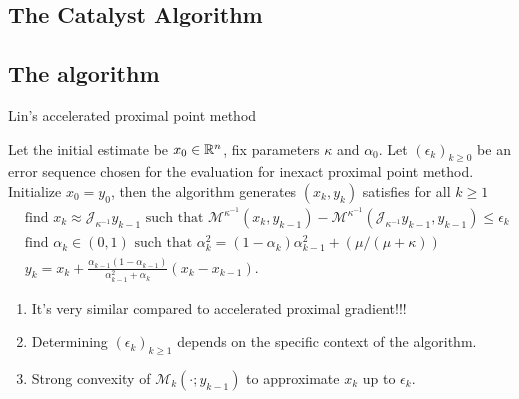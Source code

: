 \documentclass[11pt]{beamer}
\begin{document}
    \subsection{The Catalyst Algorithm}
        \subsection{The algorithm}
            \begin{frame}{Lin's accelerated proximal point method}
                \begin{definition}
                    Let the initial estimate be $x_0 \in \mathbb R^n$, fix parameters $\kappa$ and $\alpha_0$. 
                    Let $(\epsilon_k)_{k \ge 0}$ be an error sequence chosen for the evaluation for inexact proximal point method. 
                    Initialize $x_0 = y_0$, then the algorithm generates $(x_k, y_k)$ satisfies for all $k \ge 1$
                    {\small
                    \begin{align*}
                        & \text{find } x_k \approx \mathcal J_{\kappa^{-1}} y_{k - 1} \text{ such that } \mathcal M^{\kappa^{-1}}(x_k, y_{k - 1}) - \mathcal M^{\kappa^{-1}}(\mathcal J_{\kappa^{-1}}y_{k - 1}, y_{k - 1}) \le \epsilon_k
                        \\
                        & \text{find } \alpha_k \in (0, 1) \text{ such that } \alpha_k^2 = (1 - \alpha_k)\alpha_{k - 1}^2 + (\mu/(\mu + \kappa)) 
                        \\
                        & 
                        y_{k} = x_k + \frac{\alpha_{k - 1}(1 - \alpha_{k - 1})}{\alpha_{k - 1}^2 + \alpha_k}(x_k - x_{k - 1}). 
                    \end{align*}
                    }
                \end{definition}
                \pause
                \begin{enumerate}
                    \item It's very similar compared to accelerated proximal gradient!!!
                    \item Determining $(\epsilon_k)_{k \ge 1}$ depends on the specific context of the algorithm. 
                    \item Strong convexity of $\mathcal M_k(\cdot; y_{k - 1})$ to approximate $x_k$ up to $\epsilon_k$. 
                \end{enumerate}
            \end{frame}
\end{document}
